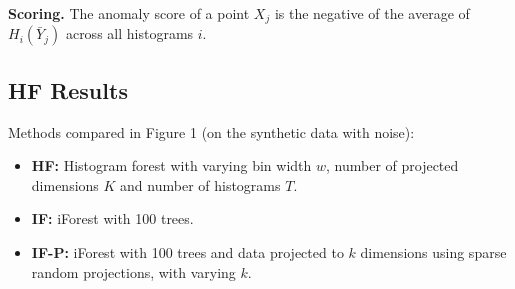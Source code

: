 \documentclass[11pt,onecolumn]{article}
\begin{document}
\textbf{Scoring.} The anomaly score of a point $X_j$ is the negative of the average of $H_i(\bar{Y}_j)$ across all histograms $i$.

\subsection{HF Results}

Methods compared in Figure 1 (on the synthetic data with noise):
\begin{itemize}
	\item \textbf{HF:} Histogram forest with varying bin width $w$, number of projected dimensions $K$ and number of histograms $T$.
	\item \textbf{IF:} iForest with 100 trees.
	\item \textbf{IF-P:} iForest with 100 trees and data projected to $k$ dimensions using sparse random projections, with varying $k$.
\end{itemize}
\end{document}

